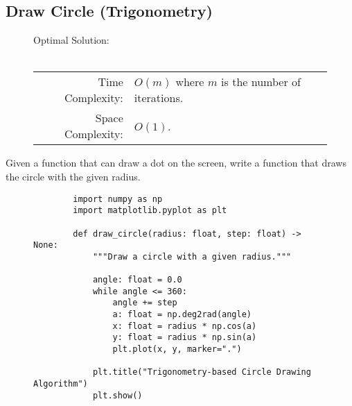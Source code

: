 
\subsection{Draw Circle (Trigonometry)}

\begin{figure}[H]
    Optimal Solution:\\\\
    \begin{tabular}{rl}
        Time Complexity:& \(O(m)\) where \(m\) is the number of iterations.\\
        Space Complexity:& \(O(1)\).
    \end{tabular}
\end{figure}

Given a function that can draw a dot on the screen, write a function that draws
the circle with the given radius.

\begin{figure}[H]
    \centering
    \begin{verbatim}
        import numpy as np
        import matplotlib.pyplot as plt

        def draw_circle(radius: float, step: float) -> None:
            """Draw a circle with a given radius."""

            angle: float = 0.0
            while angle <= 360:
                angle += step
                a: float = np.deg2rad(angle)
                x: float = radius * np.cos(a)
                y: float = radius * np.sin(a)
                plt.plot(x, y, marker=".")

            plt.title("Trigonometry-based Circle Drawing Algorithm")
            plt.show()
    \end{verbatim}
\end{figure}
